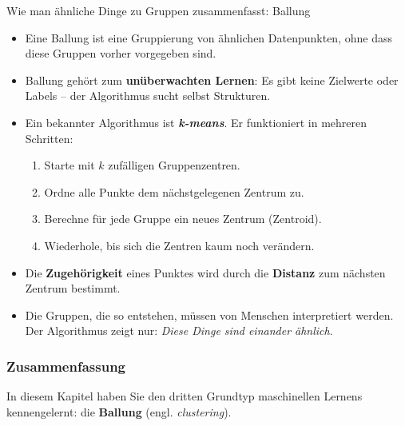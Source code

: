 \begin{lpu}{Wie man ähnliche Dinge zu Gruppen zusammenfasst: Ballung}
\begin{itemize}
  \item Eine Ballung ist eine Gruppierung von ähnlichen Datenpunkten, ohne dass diese Gruppen vorher vorgegeben sind.
  \item Ballung gehört zum \textbf{unüberwachten Lernen}: Es gibt keine Zielwerte oder Labels – der Algorithmus sucht selbst Strukturen.
  \item Ein bekannter Algorithmus ist \textbf{\textit{k-means}}. Er funktioniert in mehreren Schritten:
    \begin{enumerate}
      \item Starte mit $k$ zufälligen Gruppenzentren.
      \item Ordne alle Punkte dem nächstgelegenen Zentrum zu.
      \item Berechne für jede Gruppe ein neues Zentrum (Zentroid).
      \item Wiederhole, bis sich die Zentren kaum noch verändern.
    \end{enumerate}
  \item Die \textbf{Zugehörigkeit} eines Punktes wird durch die \textbf{Distanz} zum nächsten Zentrum bestimmt.
  \item Die Gruppen, die so entstehen, müssen von Menschen interpretiert werden. Der Algorithmus zeigt nur: \textit{Diese Dinge sind einander ähnlich}.
\end{itemize}


\subsubsection*{Zusammenfassung}

In diesem Kapitel haben Sie den dritten Grundtyp maschinellen Lernens kennengelernt: die \textbf{Ballung} (engl. \textit{clustering}).  


\end{lpu}
